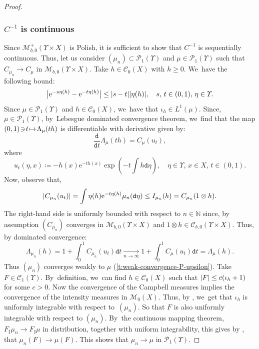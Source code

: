 \documentclass[10pt]{amsart}
\newcommand\mto{\mathchoice{\longmapsto}{\mapsto}{\mapsto}{\mapsto}}
\theoremstyle{definition}
\theoremstyle{remark}
\DeclarePairedDelimiter{\abs}{\lvert}{\rvert}
\begin{document}
\begin{proof}
\subsubsection*{$C^{-1}$ is continuous}
Since $\mathscr{M}^{+}_{b,0}(\varUpsilon \times X)$ is Polish, it is sufficient to show that $C^{-1}$ is sequentially continuous.
Thus, let us consider $(\mu_{n}) \subset \mathscr{P}_{1}(\varUpsilon)$ and $\mu \in \mathscr{P}_{1}(\varUpsilon)$ such that $C_{\mu_{n}} \to C_{\mu}$ in $\mathscr{M}_{b,0}(\varUpsilon \times X)$.
Take $h \in \mathscr{C}_{0}(X)$ with $h \geq 0$. We~have the following bound:
\begin{equation*}
\abs[\big]{\mathrm{e}^{-s\eta(h)} - \mathrm{e}^{-t\eta(h)} } \leq \abs{s-t} \abs{\eta(h)}, \quad s,\,t \in (0,1),\, \eta \in \varUpsilon.
\end{equation*}
Since $\mu \!\in\! \mathscr{P}_{1}(\varUpsilon)$ and $h \!\in\! \mathscr{C}_{0}(X)$, we~have that $\iota_{h} \!\in\! L^{1}(\mu)$.
Since, $\mu \!\in\! \mathscr{P}_{1}(\varUpsilon)$, by~Lebesgue dominated convergence theorem, we~find that the map $(0,1) \!\ni\! t \!\mto\! \Lambda_{\mu}(th)$ is differentiable with derivative given by:
\begin{equation*}
\frac{\mathtt{d}}{\mathtt{d} t} \Lambda_{\mu}(th) = C_{\mu}(u_{t}),
\end{equation*}
where
\begin{equation*}
u_{t}(\eta, x) \coloneq - h(x) \mathrm{e}^{-th(x)} \exp\left(-t \int h \mathtt{d} \eta\right), \quad \eta \in \varUpsilon,\, x \in X,\, t \in (0,1).
\end{equation*}
Now, observe that,
\begin{equation*}
\abs{ C_{\mu_{n}}(u_{t}) } = \int \eta(h) \mathrm{e}^{-t\eta(h)} \mu_{n}(\mathtt{d} \eta) \leq I_{\mu_{n}}(h) = C_{\mu_{n}}(1 \otimes h).
\end{equation*}
The right-hand side is uniformly bounded with respect to $n \in \mathbb{N}$ since, by assumption $(C_{\mu_{n}})$ converges in $\mathscr{M}_{b,0}(\varUpsilon \times X)$ and $1 \otimes h \in \mathscr{C}_{b,0}(\varUpsilon \times X)$.
Thus, by dominated convergence:
\begin{equation*}
\Lambda_{\mu_{n}}(h) = 1 + \int_{0}^{1} C_{\mu_{n}}(u_{t}) \mathtt{d} t \xrightarrow[n \to \infty]{} 1 + \int_{0}^{1} C_{\mu}(u_{t}) \mathtt{d} t = \Lambda_{\mu}(h).
\end{equation*}
Thus $(\mu_{n})$ converges weakly to $\mu$ (\cref{t:weak-convergence-P-upsilon}).
Take $F \in \mathscr{C}_{1}(\varUpsilon)$.
By~definition, we~can find $h \in \mathscr{C}_{0}(X)$ such that $\abs{F} \leq c (\iota_{h} + 1)$ for some $c > 0$.
Now the convergence of the Campbell measures implies the convergence of the intensity measures in $\mathscr{M}_{0}(X)$.
Thus, by \cite[Lem.\,5.11]{KallenbergFMP}, we~get that $\iota_{h}$ is uniformly integrable with respect to~$(\mu_{n})$.
So that $F$ is also uniformly integrable with respect to $(\mu_{n})$.
By~the continuous mapping theorem, $F_{\sharp} \mu_{n} \to F_{\sharp} \mu$ in distribution, together with uniform integrability, this gives by \cite[Lem.\,5.11]{KallenbergFMP}, that $\mu_{n}(F) \to \mu(F)$.
This shows that $\mu_{n} \to \mu$ in $\mathscr{P}_{1}(\varUpsilon)$.
\end{proof}
\end{document}
